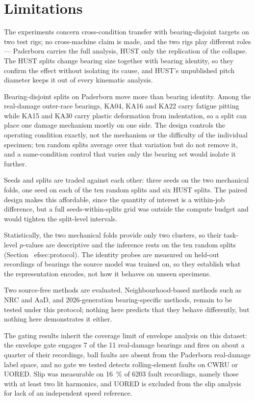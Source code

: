 \section{Limitations}
\label{sec:limitations}

The experiments concern cross-condition transfer with bearing-disjoint targets on two test rigs; no cross-machine claim is
made, and the two rigs play different roles --- Paderborn carries the full analysis, HUST only the replication of the
collapse. The HUST splits change bearing size together with bearing identity, so they confirm the effect without isolating
its cause, and HUST's unpublished pitch diameter keeps it out of every kinematic analysis.

Bearing-disjoint splits on Paderborn move more than bearing identity. Among the real-damage outer-race bearings, KA04, KA16
and KA22 carry fatigue pitting while KA15 and KA30 carry plastic deformation from indentation, so a split can place one
damage mechanism mostly on one side. The design controls the operating condition exactly, not the mechanism or the
difficulty of the individual specimen; ten random splits average over that variation but do not remove it, and a
same-condition control that varies only the bearing set would isolate it further.

Seeds and splits are traded against each other: three seeds on the two mechanical folds, one seed on each of the ten random
splits and six HUST splits. The paired design makes this affordable, since the quantity of interest is a within-job
difference, but a full seeds-within-splits grid was outside the compute budget and would tighten the split-level intervals.

Statistically, the two mechanical folds provide only two clusters, so their task-level $p$-values are descriptive and the
inference rests on the ten random splits (Section~
ef{sec:protocol}). The identity probes are measured on held-out
recordings of bearings the source model was trained on, so they establish what the representation encodes, not how it
behaves on unseen specimens.

Two source-free methods are evaluated. Neighbourhood-based methods such as NRC and AaD, and 2026-generation bearing-specific
methods, remain to be tested under this protocol; nothing here predicts that they behave differently, but nothing here
demonstrates it either.

The gating results inherit the coverage limit of envelope analysis on this dataset: the envelope gate engages 7 of the 11
real-damage bearings and fires on about a quarter of their recordings, ball faults are absent from the Paderborn real-damage label space, and no gate we tested detects rolling-element
faults on CWRU or UORED. Slip was measurable on \SI{16}{\percent} of 6203 fault recordings, namely those with at least two
lit harmonics, and UORED is excluded from the slip analysis for lack of an independent speed reference.

